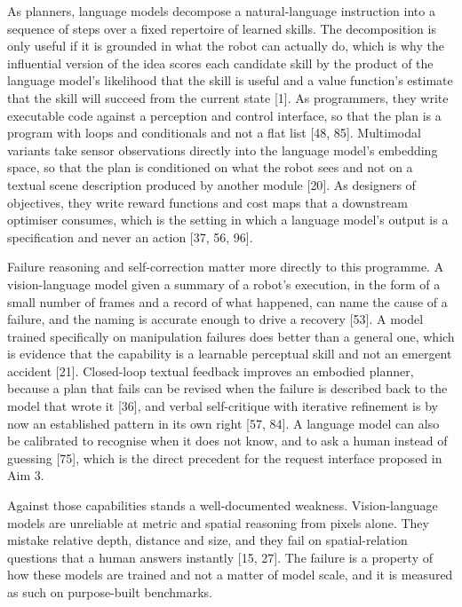 \documentclass[
  11pt,
]{article}
\begin{document}
As planners, language models decompose a natural-language instruction
into a sequence of steps over a fixed repertoire of learned skills. The
decomposition is only useful if it is grounded in what the robot can
actually do, which is why the influential version of the idea scores
each candidate skill by the product of the language model's likelihood
that the skill is useful and a value function's estimate that the skill
will succeed from the current state {[}1{]}. As programmers, they write
executable code against a perception and control interface, so that the
plan is a program with loops and conditionals and not a flat list {[}48,
85{]}. Multimodal variants take sensor observations directly into the
language model's embedding space, so that the plan is conditioned on
what the robot sees and not on a textual scene description produced by
another module {[}20{]}. As designers of objectives, they write reward
functions and cost maps that a downstream optimiser consumes, which is
the setting in which a language model's output is a specification and
never an action {[}37, 56, 96{]}.

Failure reasoning and self-correction matter more directly to this
programme. A vision-language model given a summary of a robot's
execution, in the form of a small number of frames and a record of what
happened, can name the cause of a failure, and the naming is accurate
enough to drive a recovery {[}53{]}. A model trained specifically on
manipulation failures does better than a general one, which is evidence
that the capability is a learnable perceptual skill and not an emergent
accident {[}21{]}. Closed-loop textual feedback improves an embodied
planner, because a plan that fails can be revised when the failure is
described back to the model that wrote it {[}36{]}, and verbal
self-critique with iterative refinement is by now an established pattern
in its own right {[}57, 84{]}. A language model can also be calibrated
to recognise when it does not know, and to ask a human instead of
guessing {[}75{]}, which is the direct precedent for the request
interface proposed in Aim 3.

Against those capabilities stands a well-documented weakness.
Vision-language models are unreliable at metric and spatial reasoning
from pixels alone. They mistake relative depth, distance and size, and
they fail on spatial-relation questions that a human answers instantly
{[}15, 27{]}. The failure is a property of how these models are trained
and not a matter of model scale, and it is measured as such on
purpose-built benchmarks.
\end{document}
